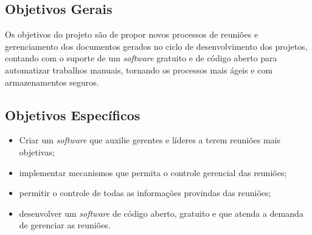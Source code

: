 \subsection{Objetivos Gerais}
\label{sec:objetivos_gerais}

Os objetivos do projeto são de propor novos processos de reuniões e gerenciamento dos documentos gerados no ciclo de desenvolvimento dos projetos, contando com o suporte de um \textit{software} gratuito e de código aberto para automatizar trabalhos manuais, tornando os processos mais ágeis e com armazenamentos seguros.

\subsection{Objetivos Específicos}
\label{sec:objetivos_especificos}

\begin{itemize}
    \item Criar um \textit{software} que auxilie gerentes e líderes a terem reuniões mais objetivas;
    \item implementar mecanismos que permita o controle gerencial das reuniões;
    \item permitir o controle de todas as informações provindas das reuniões;
    \item desenvolver um \textit{software} de código aberto, gratuito e que atenda a demanda de gerenciar as reuniões.
\end{itemize}